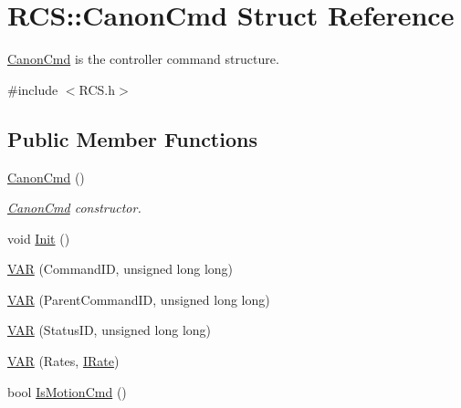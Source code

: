 \hypertarget{structRCS_1_1CanonCmd}{\section{R\-C\-S\-:\-:Canon\-Cmd Struct Reference}
\label{structRCS_1_1CanonCmd}
}


\hyperlink{structRCS_1_1CanonCmd}{Canon\-Cmd} is the controller command structure.  




{\ttfamily \#include $<$R\-C\-S.\-h$>$}

\subsection*{Public Member Functions}
\begin{DoxyCompactItemize}
\item 
\hyperlink{structRCS_1_1CanonCmd_a29c997874838bcca02aea1200bb785eb}{Canon\-Cmd} ()
\begin{DoxyCompactList}\small\item\em \hyperlink{structRCS_1_1CanonCmd}{Canon\-Cmd} constructor. \end{DoxyCompactList}\item 
void \hyperlink{structRCS_1_1CanonCmd_acc6132ab423f9349c970785d9f06d542}{Init} ()
\item 
\hyperlink{structRCS_1_1CanonCmd_a493a750837dc6e140e218f4d800faf72}{V\-A\-R} (Command\-I\-D, unsigned long long)
\item 
\hyperlink{structRCS_1_1CanonCmd_a052f3e27333e03886a95a7844e92b71c}{V\-A\-R} (Parent\-Command\-I\-D, unsigned long long)
\item 
\hyperlink{structRCS_1_1CanonCmd_a38899ecf42f1c5ca2921508dea054e3e}{V\-A\-R} (Status\-I\-D, unsigned long long)
\item 
\hyperlink{structRCS_1_1CanonCmd_aefa3700ebd88b157b3975c39d69b0edf}{V\-A\-R} (Rates, \hyperlink{classRCS_1_1IRate}{I\-Rate})
\item 
bool \hyperlink{structRCS_1_1CanonCmd_ab316e8d36adcebbe7b315cb1ed5fe86b}{Is\-Motion\-Cmd} ()
\end{DoxyCompactItemize}
